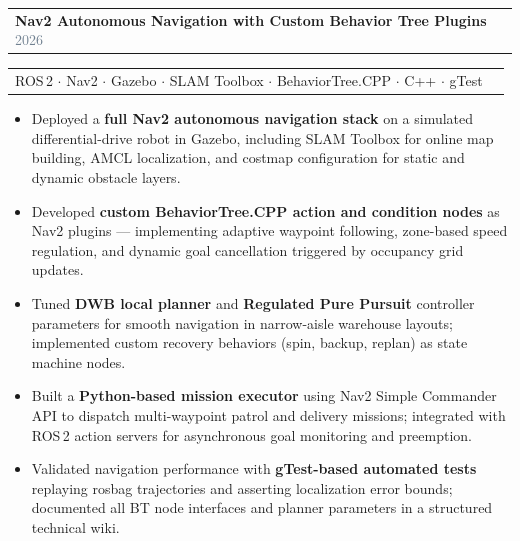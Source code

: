 \documentclass[a4paper,10pt]{article}
\makeatletter
\newcommand{\resumeProjectHeading}[2]{
  \vspace{-2pt}\item[]
  \begin{tabular*}{\textwidth}{l@{\extracolsep{\fill}}r}
    \small #1 & {\color{SlateGray}\small #2} \\
  \end{tabular*}\vspace{-5pt}
}
\newcommand{\resumeItem}[1]{
  \item\small{#1\vspace{-2pt}}
}
\newcommand{\resumeItemListStart}{\begin{itemize}[leftmargin=0.18in, itemsep=0.5pt, topsep=2pt]}
\newcommand{\resumeItemListEnd}{\end{itemize}\vspace{-3pt}}
\makeatother
\begin{document}
  \vspace{3pt}

  \resumeProjectHeading
    {\textbf{\color{DarkNavy}Nav2 Autonomous Navigation with Custom Behavior Tree Plugins} \hfill \textcolor{SlateGray}{\small 2026}}{}
  \vspace{-10pt}
  \resumeProjectHeading
    {\textcolor{MidBlue}{\small ROS\,2 $\cdot$ Nav2 $\cdot$ Gazebo $\cdot$ SLAM Toolbox $\cdot$ BehaviorTree.CPP $\cdot$ C++ $\cdot$ gTest}}{}
  \resumeItemListStart
    \resumeItem{Deployed a \textbf{full Nav2 autonomous navigation stack} on a simulated differential-drive robot in Gazebo, including SLAM Toolbox for online map building, AMCL localization, and costmap configuration for static and dynamic obstacle layers.}
    \resumeItem{Developed \textbf{custom BehaviorTree.CPP action and condition nodes} as Nav2 plugins — implementing adaptive waypoint following, zone-based speed regulation, and dynamic goal cancellation triggered by occupancy grid updates.}
    \resumeItem{Tuned \textbf{DWB local planner} and \textbf{Regulated Pure Pursuit} controller parameters for smooth navigation in narrow-aisle warehouse layouts; implemented custom recovery behaviors (spin, backup, replan) as state machine nodes.}
    \resumeItem{Built a \textbf{Python-based mission executor} using Nav2 Simple Commander API to dispatch multi-waypoint patrol and delivery missions; integrated with ROS\,2 action servers for asynchronous goal monitoring and preemption.}
    \resumeItem{Validated navigation performance with \textbf{gTest-based automated tests} replaying rosbag trajectories and asserting localization error bounds; documented all BT node interfaces and planner parameters in a structured technical wiki.}
  \resumeItemListEnd

  \vspace{3pt}
\end{document}

